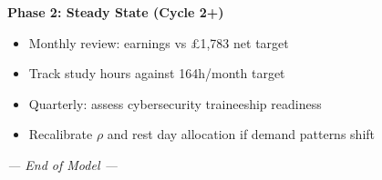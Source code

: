 \documentclass[a4paper,11pt]{article}
\begin{document}
\textbf{Phase 2: Steady State (Cycle 2+)}

\begin{itemize}[label=$\square$, leftmargin=2em]
\item Monthly review: earnings vs \pounds1,783 net target
\item Track study hours against 164h/month target
\item Quarterly: assess cybersecurity traineeship readiness
\item Recalibrate $\rho$ and rest day allocation if demand patterns shift
\end{itemize}

\vspace{2cm}
\begin{center}
\textit{\textcolor{accentblue}{--- End of Model ---}}
\end{center}
\end{document}
